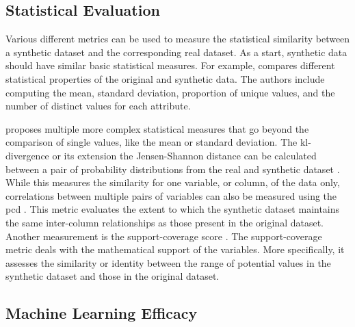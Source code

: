 \subsection{Statistical Evaluation}
\label{ch:preliminaries-statisticalEvaluation}

Various different metrics can be used to measure the statistical similarity between a synthetic dataset and the corresponding real dataset.
As a start, synthetic data should have similar basic statistical measures.
For example, \cite{delcarmenrodriguez-hernandez2017DataGenCARSGeneratorSynthetic} compares different statistical properties of the original and synthetic data. 
The authors include computing the mean, standard deviation, proportion of unique values, and the number of distinct values for each attribute.

\cite{goncalves2020GenerationEvaluationSynthetic} proposes multiple more complex statistical measures that go beyond the comparison of single values, like the mean or standard deviation.
The \gls{kl}-divergence or its extension the Jensen-Shannon distance \cite{zhao2022CTABGANEnhancingTabular} can be calculated between a pair of probability distributions from the real and synthetic dataset \cite{goncalves2020GenerationEvaluationSynthetic, li2022TTSGANTransformerbasedTimeSeries}.
While this measures the similarity for one variable, or column, of the data only, correlations between multiple pairs of variables can also be measured using the \gls{pcd} \cite{goncalves2020GenerationEvaluationSynthetic}.
This metric evaluates the extent to which the synthetic dataset maintains the same inter-column relationships as those present in the original dataset.
Another measurement is the support-coverage score \cite{goncalves2020GenerationEvaluationSynthetic}.
The support-coverage metric deals with the mathematical support of the variables. 
More specifically, it assesses the similarity or identity between the range of potential values in the synthetic dataset and those in the original dataset.

\subsection{Machine Learning Efficacy}
\label{ch:preliminaries-machineLearningEfficacy}

